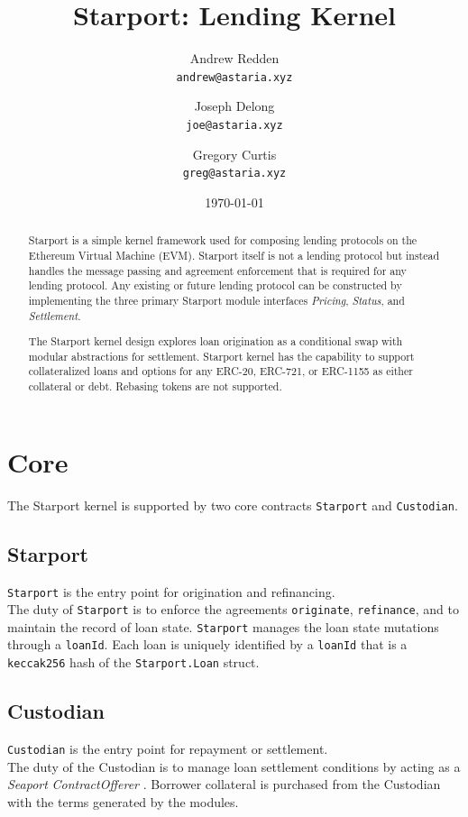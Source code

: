 \documentclass[12pt]{article}
\title{Starport: Lending Kernel}
\author{Andrew Redden \\ \texttt{andrew@astaria.xyz}
        \and
        Joseph Delong \\ \texttt{joe@astaria.xyz}
        \and
        Gregory Curtis \\ \texttt{greg@astaria.xyz}}
\date{\today}
\begin{document}
\maketitle

\begin{abstract}
Starport is a simple kernel framework used for composing lending protocols on the Ethereum Virtual Machine (EVM).
Starport itself is not a lending protocol but instead handles the message passing and agreement enforcement that is required for any lending protocol.
Any existing or future lending protocol can be constructed by implementing the three primary Starport module interfaces \emph{Pricing}, \emph{Status}, and \emph{Settlement}.

The Starport kernel design explores loan origination as a conditional swap with modular  abstractions for settlement. Starport kernel has the capability to support collateralized loans and options for any ERC-20\cite{erc20}, ERC-721\cite{erc721}, or ERC-1155\cite{erc1155} as either collateral or debt. Rebasing tokens are not supported.
\end{abstract}

\section{Core}
The Starport kernel is supported by two core contracts \texttt{Starport} and \texttt{Custodian}.
\subsection{Starport}

\texttt{Starport} is the entry point for origination and refinancing.\\

The duty of \texttt{Starport} is to enforce the agreements \texttt{originate}, \texttt{refinance}, and to maintain the record of loan state. \texttt{Starport} manages the loan state mutations through a  \texttt{loanId}. Each loan is uniquely identified by a \texttt{loanId} that is a \texttt{keccak256} hash of the \texttt{Starport.Loan} struct.

\subsection{Custodian}

\texttt{Custodian} is the entry point for repayment or settlement.\\

The duty of the Custodian is to manage loan settlement conditions by acting as a \emph{Seaport}\cite{seaport}  \emph{ContractOfferer} . Borrower collateral is purchased from the Custodian with the terms generated by the modules.\\
\end{document}
